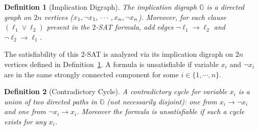 \documentclass[11pt,reqno]{amsart}
\numberwithin{equation}{section}
\newcommand\GG{\mathbb{G}}
\newcommand\Def{Definition}
\newtheorem{definition}{Definition}[section]
\begin{document}
	\begin{definition}[Implication Digraph]\label{def_implication}
		The implication digraph $\GG$ is a directed graph on $2n$ vertices ($x_1, \neg{x}_1, \\
		\cdots, x_n, \neg{x}_n$).
		Moreover, for each clause $(\ell_1 \vee \ell_2)$ present in the $2$-SAT formula, add edges $\neg{\ell_1} \to \ell_2$ and $\neg{\ell_2} \to \ell_1$.
	\end{definition}
	The satisfiability of this $2$-SAT is analyzed via its implication digraph on $2n$ vertices defined in \Def~\ref{def_implication}. 
	A formula is unsatisfiable if variable $x_i$ and $\neg x_i$ are in the same strongly connected component for some $i\in\{1,\cdots,n\}$.
	\begin{definition}[Contradictory Cycle]
		A contradictory cycle for variable $x_i$ is a union of two directed paths in $\GG$ (not necessarily disjoint): one from $x_i \to \neg{x_i}$ and one from $\neg{x_i} \to x_i$. 
		Moreover the formula is unsatisfiable if such a cycle exists for any $x_i$.
	\end{definition}
	
\end{document}
